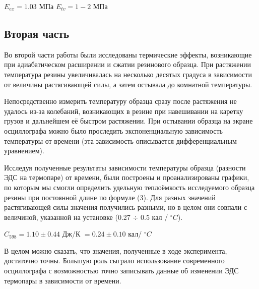 \documentclass[a4paper,11.5pt]{article} %
\begin{document}
\begin{center}
$E_{ex} = 1.03 $ МПа \hspace{1cm} $E_{tv} = 1 - 2$ МПа
\end{center}

\subsection{Вторая часть}
Во второй части работы были исследованы термические эффекты, возникающие при адиабатическом расширении и сжатии резинового образца. При растяжении температура резины увеличивалась на несколько десятых градуса в зависимости от величины растягивающей силы, а затем остывала до комнатной температуры. \par 
Непосредственно измерить температуру образца сразу после растяжения не удалось из-за колебаний, возникающих в резине при навешивании на каретку грузов и дальнейшем её быстром растяжении. При остывании образца на экране осциллографа можно было проследить экспоненциальную зависимость температуры от времени (эта зависимость описывается дифференциальным уравнением). \par 
Исследуя полученные результаты зависимости температуры образца (разности ЭДС на термопаре) от времени, были построены и проанализированы графики, по которым мы смогли определить удельную теплоёмкость исследуемого образца резины при постоянной длине по формуле (3). Для разных значений растягивающей силы значения получились разными, но в целом они совпали с величиной, указанной на установке (0.27 $\div$ 0.5 кал / $^\circ C$).

\begin{center}
$C_{598} = 1.10 \pm 0.44$ Дж/К $ = 0.24 \pm 0.10 $ кал/ $^\circ C$ \\
\end{center}

В целом можно сказать, что значения, полученные в ходе эксперимента, достаточно точны. Большую роль сыграло использование современного осциллографа с возможностью точно записывать данные об изменении ЭДС термопары в зависимости от времени. 
\end{document}
